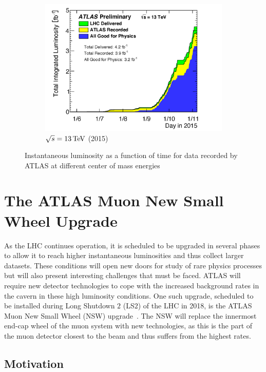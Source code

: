 \begin{figure}[h!]
\begin{subfigure}[t]{0.5\textwidth}
        \includegraphics[width=\textwidth]{figures/ATLAS_lumi_2015}
        \caption{$\sqrt{s} = 13 \TeV$ (2015)}
    \end{subfigure}

   \caption{Instantaneous luminosity as a function of time for data recorded by ATLAS at different center of mass energies~\cite{Lumi_Run1, Lumi_Run2}}
  \label{fig:lumis}
\end{figure}


\section{The ATLAS Muon New Small Wheel Upgrade}

As the LHC continues operation, it is scheduled to be upgraded in several phases to allow it to reach higher instantaneous luminosities and thus collect larger datasets. These conditions will open new doors for study of rare physics processes but will also present interesting challenges that must be faced. ATLAS will require new detector technologies to cope with the increased background rates in the cavern in these high luminosity conditions. One such upgrade, scheduled to be installed during Long Shutdown $2$ (LS$2$) of the LHC in 2018, is the ATLAS Muon New Small Wheel (NSW) upgrade~\cite{NSW_TDR}. The NSW will replace the innermost end-cap wheel of the muon system with new technologies, as this is the part of the muon detector closest to the beam and thus suffers from the highest rates. 

\subsection{Motivation}

